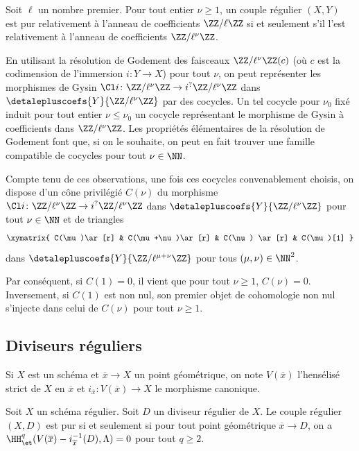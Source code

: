 \documentclass[10pt]{../fichiers-configuration-latex/smfart}
\begin{document}
\bigskip

\begin{proposition2}\label{16-proposition-ops-n-egale-ell}
Soit $\ell$ un nombre premier. Pour tout entier $\nu\geq 1$, un couple
régulier $(X,Y)$ est pur relativement à l'anneau de coefficients
$\ZZ/\ell\ZZ$ si et seulement s'il l'est relativement à l'anneau de
coefficients $\ZZ/\ell^\nu\ZZ$.
\end{proposition2}

En utilisant la résolution de Godement des faisceaux $\ZZ/\ell^\nu\ZZ(c)$
(où $c$ est la codimension de l'immersion $i\colon Y\to X$) pour tout
$\nu$, on peut représenter les morphismes de Gysin
$\Cl i\colon \ZZ/\ell^\nu\ZZ\to i^?\ZZ/\ell^\nu\ZZ$ dans
$\detalepluscoefs{Y}{\ZZ/\ell^\nu\ZZ}$ par des cocycles. Un tel cocycle pour
$\nu_0$ fixé induit pour tout entier $\nu\leq \nu_0$ un cocycle
représentant le morphisme de Gysin à coefficients dans $\ZZ/\ell^\nu\ZZ$.
Les propriétés élémentaires de la résolution de Godement font que, si on le
souhaite, on peut en fait trouver une famille compatible de cocycles pour
tout $\nu\in\NN$.

Compte tenu de ces observations, une fois ces cocycles convenablement
choisis, on dispose d'un cône privilégié $C(\nu)$ du morphisme $\Cl
i\colon\ZZ/\ell^\nu\ZZ\to i^?\ZZ/\ell^\nu\ZZ$ dans
$\detalepluscoefs{Y}{\ZZ/\ell^\nu\ZZ}$ pour tout $\nu\in\NN$ et de triangles
\[
\xymatrix{
C(\mu)\ar[r] & C(\mu+\nu)\ar[r] & C(\nu) \ar[r] & C(\mu)[1] }
\]
dans
$\detalepluscoefs{Y}{\ZZ/\ell^{\mu+\nu}\ZZ}$ pour tous $(\mu,\nu)\in\NN^2$.

Par conséquent, si $C(1)=0$, il vient que pour tout $\nu\geq 1$,
$C(\nu)=0$. Inversement, si $C(1)$ est non nul, son premier objet de
cohomologie non nul s'injecte dans celui de $C(\nu)$ pour tout $\nu\geq 1$.

\subsection{Diviseurs réguliers}%
\label{16-subsection-diviseurs-reguliers}

\begin{definition2}
Si $X$ est un schéma et $\overline x \to X$ un point géométrique, on note
$V(\overline x)$ l'hensélisé strict de $X$ en $\overline x$ et 
$i_{\overline x}\colon V(\overline x)\to X$ le morphisme canonique.
\end{definition2}

\begin{proposition2}\label{16-proposition-caracterisation-purete-diviseur}
Soit $X$ un schéma régulier. Soit $D$ un diviseur régulier de $X$. Le
couple régulier $(X,D)$ est pur si et seulement si pour tout point
géométrique $\overline x\to D$, on a
$\HH^q_\et(V(\overline x)-i_{\overline x}^{-1}(D),\Lambda)=0$ pour tout
$q\geq 2$.
\end{proposition2}
\end{document}
